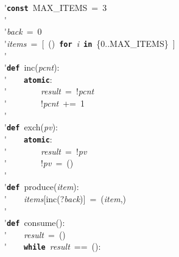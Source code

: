 \'\>\texttt{\textbf{const}}~MAX\_ITEMS~=~3\\

\'\>\\

\'\>\textit{back}~=~0\\

\'\>\textit{items}~=~[~()~\texttt{\textbf{for}}~\textit{i}~\texttt{\textbf{in}}~\{0..MAX\_ITEMS\}~]\\

\'\>\\

\'\>\texttt{\textbf{def}}~inc(\textit{pcnt}):\\

\'\>~~~~\texttt{\textbf{atomic}}:\\

\'\>~~~~~~~~\textit{result}~=~!\textit{pcnt}\\

\'\>~~~~~~~~!\textit{pcnt}~+=~1\\

\'\>\\

\'\>\texttt{\textbf{def}}~exch(\textit{pv}):\\

\'\>~~~~\texttt{\textbf{atomic}}:\\

\'\>~~~~~~~~\textit{result}~=~!\textit{pv}\\

\'\>~~~~~~~~!\textit{pv}~=~()\\

\'\>\\

\'\>\texttt{\textbf{def}}~produce(\textit{item}):\\

\'\>~~~~\textit{items}[inc(?\textit{back})]~=~(\textit{item},)\\

\'\>\\

\'\>\texttt{\textbf{def}}~consume():\\

\'\>~~~~\textit{result}~=~()\\

\'\>~~~~\texttt{\textbf{while}}~\textit{result}~==~():\\

